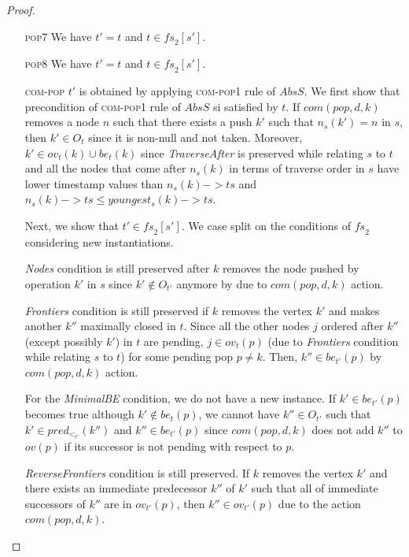 \begin{proof}
\begin{itemize}
\item[\textsc{pop7}] We have $t' = t$ and $t \in \mathit{fs}_2[s']$.
\item[\textsc{pop8}] We have $t' = t$ and $t \in \mathit{fs}_2[s']$.
\item[\textsc{com-pop}] $t'$ is obtained by applying \textsc{com-pop1} rule of $AbsS$.
We first show that precondition of \textsc{com-pop1} rule of $AbsS$ si satisfied by $t$. If $com(pop,d,k)$ removes a  node $n$ such that there exists a push $k'$ such that $n_s(k') =n$ in $s$, then $k' \in O_t$ since it is non-null and not taken. Moreover, $k' \in ov_t(k) \cup be_t(k)$ since \emph{TraverseAfter} is preserved while relating $s$ to $t$ and all the nodes that come after $n_s(k)$ in terms of traverse order in $s$ have lower timestamp values than $n_s(k)->ts$ and $n_s(k)->ts \leq youngest_s(k)->ts$.

Next, we show that $t' \in \mathit{fs}_2[s']$. We case split on the conditions of $\mathit{fs}_2$ considering new instantiations.

\emph{Nodes} condition is still preserved after $k$ removes the node pushed by operation $k'$ in $s$ since $k' \notin O_{t'}$ anymore by due to $com(pop,d,k)$ action. 

\emph{Frontiers} condition is still preserved if $k$ removes the vertex $k'$ and makes another $k''$ maximally closed in $t$. Since all the other nodes $j$ ordered after $k''$ (except possibly $k'$) in $t$ are pending, $j \in ov_t(p)$ (due to \emph{Frontiers} condition while relating $s$ to $t$) for some pending pop $p \neq k$. Then, $k'' \in be_{t'}(p)$ by $com(pop,d,k)$ action. 

For the \emph{MinimalBE} condition, we do not have a new instance. If $k' \in be_{t'}(p)$ becomes true although $k' \notin be_t(p)$, we cannot have $k'' \in O_{t'}$ such that $k' \in pred_{<_{t'}}(k'')$ and $k'' \in be_{t'}(p)$ since $com(pop,d,k)$ does not add $k''$ to $ov(p)$ if its successor is not pending with respect to $p$.

\emph{ReverseFrontiers} condition is still preserved. If $k$ removes the vertex $k'$ and there exists an immediate predecessor $k''$ of $k'$ such that all of immediate successors of $k''$ are in $ov_{t'}(p)$, then $k'' \in ov_{t'}(p)$ due to the action $com(pop,d,k)$.


\end{itemize}
\end{proof}
